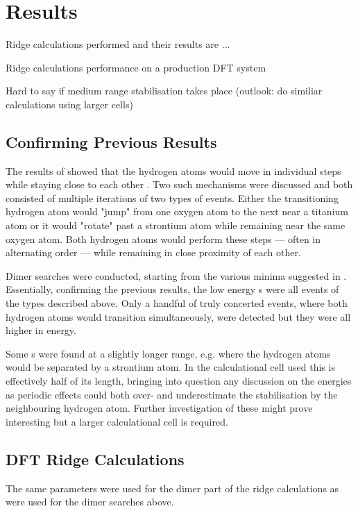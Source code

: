 \section{Results}
\label{sec:perovskites-results}

\bit
\item Ridge calculations performed and their results are ...
\item Ridge calculations performance on a production DFT system
\item Hard to say if medium range stabilisation takes place (outlook: do similiar calculations using larger cells)
\eit

\subsection{Confirming Previous Results}
The results of \cite{double-defect-2011} showed that the hydrogen atoms would move in individual steps while staying close to each other .
Two such mechanisms were discussed and both consisted of multiple iterations of two types of events.
Either the transitioning hydrogen atom would "jump" from one oxygen atom to the next near a titanium atom or it would "rotate" past a strontium atom while remaining near the same oxygen atom.
Both hydrogen atoms would perform these steps --- often in alternating order --- while remaining in close proximity of each other.

Dimer  searches were conducted, starting from the various minima suggested in \cite{double-defect-2011}.
Essentially, confirming the previous results, the low energy s were all events of the types described above.
Only a handful of truly concerted events, where both hydrogen atoms would transition simultaneously, were detected but they were all higher in energy.

Some s were found at a slightly longer range, e.g. where the hydrogen atoms would be separated by a strontium atom.
In the calculational cell used this is effectively half of its length, bringing into question any discussion on the energies as periodic effects could both over- and underestimate the stabilisation by the neighbouring hydrogen atom.
Further investigation of these might prove interesting but a larger calculational cell is required.

\subsection{DFT Ridge Calculations}
The same parameters were used for the dimer part of the ridge calculations as were used for the dimer searches above.

